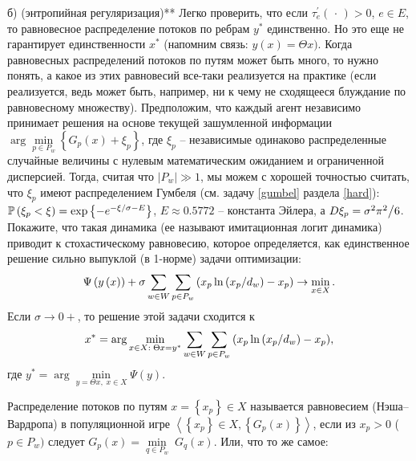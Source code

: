 \begin{problem} 
б) (энтропийная регуляризация)** Легко проверить, что если $\tau _e 
^\prime \left( {\,\cdot \,} \right)>0$, $e\in E$, то равновесное 
распределение потоков по ребрам $y^\ast $ единственно. Но это еще не 
гарантирует единственности $x^\ast $ (напомним связь: $y\left( x 
\right)=\Theta x)$. Когда равновесных распределений потоков по путям может 
быть много, то нужно понять, а какое из этих равновесий все-таки реализуется 
на практике (если реализуется, ведь может быть, например, ни к чему не 
сходящееся блуждание по равновесному множеству). Предположим, что каждый 
агент независимо принимает решения на основе текущей зашумленной информации 
$\arg \mathop {\min }\limits_{p\in P_w } \left\{ {G_p \left( x \right)+\xi 
_p } \right\}$, где $\xi _p $ -- независимые одинаково распределенные 
случайные величины с нулевым математическим ожиданием и ограниченной 
дисперсией. Тогда, считая что $\left| {P_w } \right|\gg 1$, мы можем с 
хорошей точностью считать, что $\xi _p $ имеют распределением Гумбеля (см. 
задачу \ref{gumbel} раздела \ref{hard}): $\PR\left( {\xi _p <\xi } \right)=\exp 
\left\{ {-e^{-\xi \mathord{\left/ {\vphantom {\xi \sigma }} \right. 
\kern-\nulldelimiterspace} \sigma -E}} \right\}$, $E\approx 0.5772$ -- 
константа Эйлера, а $D\xi _p ={\sigma ^2\pi ^2} \mathord{\left/ {\vphantom 
{{\sigma ^2\pi ^2} 6}} \right. \kern-\nulldelimiterspace} 6$. Покажите, что 
такая динамика (ее называют имитационная логит динамика) приводит к стохастическому равновесию, которое определяется, как 
единственное решение сильно выпуклой (в 1-норме) задачи оптимизации:
\[
\Psi \left( {y\left( x \right)} \right)+\sigma \sum\limits_{w\in W} 
{\sum\limits_{p\in P_w } {\left( {x_p \ln \left( {{x_p } \mathord{\left/ 
{\vphantom {{x_p } {d_w }}} \right. \kern-\nulldelimiterspace} {d_w }} 
\right)-x_p } \right)} } \to \mathop {\min }\limits_{x\in X} .
\]
Если $\sigma \to 0+$, то решение этой задачи сходится к 
\[
x^\ast =\arg \mathop {\min }\limits_{x \in X:\;\Theta x = 
y^\ast } \sum\limits_{w\in W} {\sum\limits_{p\in P_w } {\left( {x_p \ln 
\left( {{x_p } \mathord{\left/ {\vphantom {{x_p } {d_w }}} \right. 
\kern-\nulldelimiterspace} {d_w }} \right)-x_p } \right)} } ,
\]
где $y^\ast =\arg \mathop {\min }\limits_{y=\Theta x,\;x\in X} \Psi \left( y 
\right)$.

\begin{remark}

 Распределение потоков по путям $x=\left\{ {x_p } 
\right\}\in X$ называется равновесием (Нэша--Вардропа) в популяционной игре 
$\left\langle {\left\{ {x_p } \right\}\in X,\left\{ {G_p \left( x \right)} 
\right\}} \right\rangle $, если из $x_p >0$ ($p\in P_w )$ следует $G_p 
\left( x \right)=\mathop {\min }\limits_{q\in P_w } \;G_q \left( x \right)$. 
Или, что то же самое:


\end{remark}
\end{problem}
